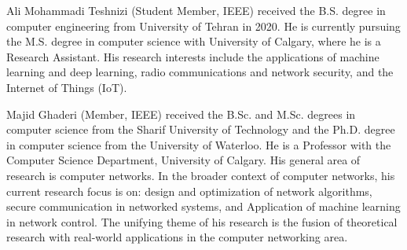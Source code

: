 % 
\begin{IEEEbiography}{Ali Mohammadi Teshnizi}
	(Student Member, IEEE) received the B.S. degree in computer engineering from
	University of Tehran in 2020. He is currently pursuing the M.S. degree in computer science with University of Calgary, where he is a Research
	Assistant. His research interests include the applications of machine learning and deep learning, radio communications and network security, and the Internet of Things (IoT).
\end{IEEEbiography}
 \baselineskip
\begin{IEEEbiography}
	{Majid Ghaderi}
(Member, IEEE) received the B.Sc. and M.Sc. degrees in computer science from the Sharif University of Technology and the Ph.D. degree in computer science from the University of Waterloo. He is a Professor with the Computer Science Department, University of Calgary. His general area of research is computer networks. In the broader context of computer networks, his current research focus is on: design and optimization of network algorithms, secure communication in networked systems, and Application of machine learning in network control. The unifying theme of his research is the fusion of theoretical research with real-world applications in the computer networking area.
\end{IEEEbiography}
